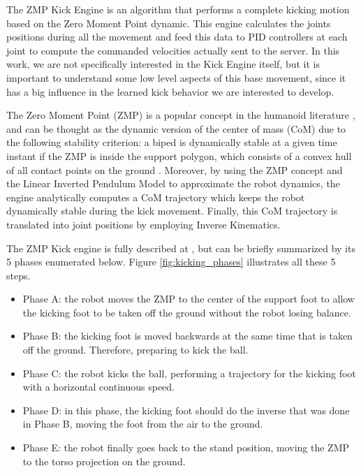 The ZMP Kick Engine is an algorithm that performs a complete kicking motion based on the Zero Moment Point dynamic. This engine calculates the joints positions during all the movement and feed this data to PID controllers at each joint to compute the commanded velocities actually sent to the server. In this work, we are not specifically interested in the Kick Engine itself, but it is important to understand some low level aspects of this base movement, since it has a big influence in the learned kick behavior we are interested to develop.

The Zero Moment Point (ZMP) is a popular concept in the humanoid literature \cite{ZMP}, and can be thought as the dynamic version of the center of mass (CoM) due to the following stability criterion: a biped is dynamically stable at a given time instant if the ZMP is inside the support polygon, which consists of a convex hull of all contact points on the ground \cite{ZMP}. Moreover, by using the ZMP concept and the Linear Inverted Pendulum Model \cite{Kajita} to approximate the robot dynamics, the engine analytically computes a CoM trajectory which keeps the robot dynamically stable during the kick movement. Finally, this CoM trajectory is translated into joint positions by employing Inverse Kinematics.



The ZMP Kick engine is fully described at \cite{MestradoManga}, but can be briefly summarized by its 5 phases enumerated below. Figure \ref{fig:kicking_phases} illustrates all these 5 steps.

\begin{itemize}
\item Phase A: the robot moves the ZMP to the center of the support foot to allow the kicking foot to be taken off the ground without the robot losing balance.

\item Phase B: the kicking foot is moved backwards at the same time that is taken off the ground. Therefore, preparing to kick the ball.

\item Phase C: the robot kicks the ball, performing a trajectory for the kicking foot with a horizontal continuous speed.

\item Phase D: in this phase, the kicking foot should do the inverse that was done in Phase B, moving the foot from the air to the ground.

\item Phase E: the robot finally goes back to the stand position, moving the ZMP to the torso projection on the ground.

\end{itemize}

